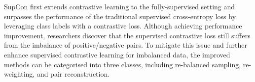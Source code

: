 SupCon \cite{khosla2020supervised} first extends contrastive learning to the fully-supervised setting and surpasses the performance of the traditional supervised cross-entropy loss by leveraging class labels with a contrastive loss. Although achieving performance improvement, researchers discover that the supervised contrastive loss still suffers from the imbalance of positive/negative pairs. To mitigate this issue and further enhance supervised contrastive learning for imbalanced data, the improved methods can be categorised into three classes, including {re-balanced sampling, re-weighting, and pair reconstruction}.

